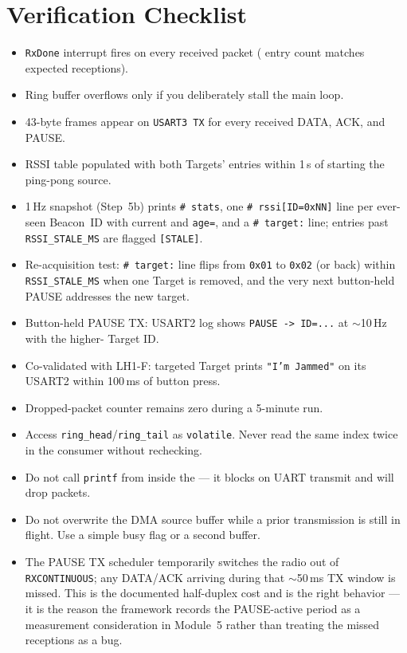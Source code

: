 \documentclass[11pt,letterpaper]{article}
\begin{document}
\section{Verification Checklist}
\begin{itemize}[leftmargin=2em]
	\item[$\square$] \texttt{RxDone} interrupt fires on every received packet (\ISR{} entry count matches expected receptions).
	\item[$\square$] Ring buffer overflows only if you deliberately stall the main loop.
	\item[$\square$] 43-byte frames appear on \texttt{USART3 TX} for every received DATA, ACK, and PAUSE.
	\item[$\square$] RSSI table populated with both Targets' entries within 1\,s of starting the ping-pong source.
	\item[$\square$] 1\,Hz snapshot (Step~5b) prints \texttt{\#~stats}, one \texttt{\#~rssi[ID=0xNN]} line per ever-seen Beacon~\mbox{ID} with current \RSSI{} and \texttt{age=}, and a \texttt{\#~target:} line; entries past \texttt{RSSI\_STALE\_MS} are flagged \texttt{[STALE]}.
	\item[$\square$] Re-acquisition test: \texttt{\#~target:} line flips from \texttt{0x01} to \texttt{0x02} (or back) within \texttt{RSSI\_STALE\_MS} when one Target is removed, and the very next button-held PAUSE addresses the new target.
	\item[$\square$] Button-held PAUSE TX: USART2 log shows \texttt{PAUSE -> ID=...} at $\sim$10\,Hz with the higher-\RSSI{} Target ID.
	\item[$\square$] Co-validated with LH1-F: targeted Target prints \texttt{"I'm Jammed"} on its USART2 within 100\,ms of button press.
	\item[$\square$] Dropped-packet counter remains zero during a 5-minute run.
\end{itemize}

\begin{tcolorbox}[warning={Concurrency Hazards}]
	\begin{itemize}[leftmargin=1.2em]
		\item Access \texttt{ring\_head}/\texttt{ring\_tail} as \texttt{volatile}. Never read the same index twice in the consumer without rechecking.
		\item Do not call \HAL{} \texttt{printf} from inside the \ISR{} --- it blocks on \mbox{UART} transmit and will drop \RF{} packets.
		\item Do not overwrite the \mbox{DMA} source buffer while a prior transmission is still in flight. Use a simple busy flag or a second buffer.
		\item The PAUSE TX scheduler temporarily switches the radio out of \texttt{RXCONTINUOUS}; any DATA/ACK arriving during that $\sim$50\,ms TX window is missed. This is the documented half-duplex cost and is the right behavior --- it is the reason the framework records the PAUSE-active period as a measurement consideration in Module~5 rather than treating the missed receptions as a bug.
	\end{itemize}
\end{tcolorbox}
\end{document}
